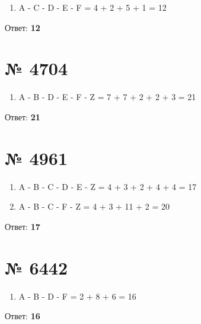 \documentclass[11pt]{article} %
\begin{document}
\begin{enumerate}
	\item A - C - D - E - F = 4 + 2 + 5 + 1 = 12
\end{enumerate}

Ответ: \textbf{12}

\section{№ \textbf{4704}}

\begin{enumerate}
	\item A - B - D - E - F - Z = 7 + 7 + 2 + 2 + 3 = 21
\end{enumerate}

Ответ: \textbf{21}

\section{№ \textbf{4961}}

\begin{enumerate}
	\item A - B - C - D - E - Z = 4 + 3 + 2 + 4 + 4 = 17
	\item A - B - C - F - Z = 4 + 3 + 11 + 2 = 20
\end{enumerate}

Ответ: \textbf{17}

\section{№ \textbf{6442}}

\begin{enumerate}
	\item A - B - D -  F = 2 + 8 + 6 = 16
\end{enumerate}

Ответ: \textbf{16}
\end{document}
